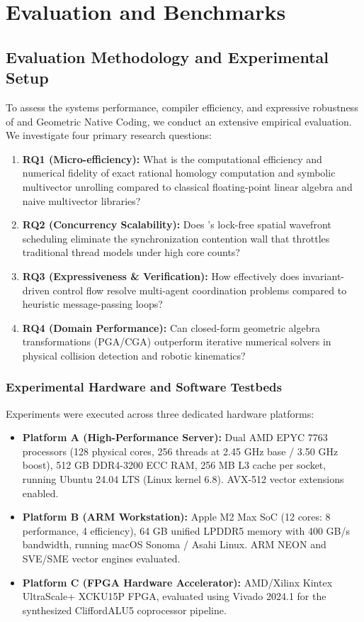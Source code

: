 \chapter{Evaluation and Benchmarks}
\label{ch:evaluation}

\section{Evaluation Methodology and Experimental Setup}
\label{sec:eval_setup}

To assess the systems performance, compiler efficiency, and expressive robustness of \ToposLang{} and Geometric Native Coding, we conduct an extensive empirical evaluation. We investigate four primary research questions:

\begin{enumerate}[leftmargin=1.5cm]
    \item \textbf{RQ1 (Micro-efficiency):} What is the computational efficiency and numerical fidelity of exact rational homology computation and symbolic multivector unrolling compared to classical floating-point linear algebra and naive multivector libraries?
    \item \textbf{RQ2 (Concurrency Scalability):} Does \ToposLang{}'s lock-free spatial wavefront scheduling eliminate the synchronization contention wall that throttles traditional thread models under high core counts?
    \item \textbf{RQ3 (Expressiveness \& Verification):} How effectively does invariant-driven control flow resolve multi-agent coordination problems compared to heuristic message-passing loops?
    \item \textbf{RQ4 (Domain Performance):} Can closed-form geometric algebra transformations (PGA/CGA) outperform iterative numerical solvers in physical collision detection and robotic kinematics?
\end{enumerate}

\subsection{Experimental Hardware and Software Testbeds}
Experiments were executed across three dedicated hardware platforms:
\begin{itemize}[leftmargin=1.5cm]
    \item \textbf{Platform A (High-Performance Server):} Dual AMD EPYC 7763 processors (128 physical cores, 256 threads at 2.45 GHz base / 3.50 GHz boost), 512 GB DDR4-3200 ECC RAM, 256 MB L3 cache per socket, running Ubuntu 24.04 LTS (Linux kernel 6.8). AVX-512 vector extensions enabled.
    \item \textbf{Platform B (ARM Workstation):} Apple M2 Max SoC (12 cores: 8 performance, 4 efficiency), 64 GB unified LPDDR5 memory with 400 GB/s bandwidth, running macOS Sonoma / Asahi Linux. ARM NEON and SVE/SME vector engines evaluated.
    \item \textbf{Platform C (FPGA Hardware Accelerator):} AMD/Xilinx Kintex UltraScale+ XCKU15P FPGA, evaluated using Vivado 2024.1 for the synthesized CliffordALU5 coprocessor pipeline.
\end{itemize}

